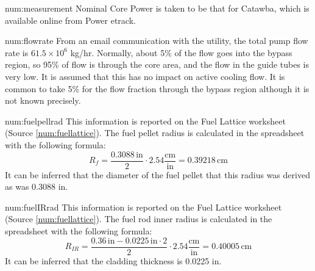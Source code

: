 \begin{numitem}{num:measurement}
  Nominal Core Power is taken to be that for Catawba, which is available online
  from Power etrack.
\end{numitem}

\begin{numitem}{num:flowrate}
  From an email communication with the utility, the total pump flow rate is $61.5\times 10^6$ kg/hr. Normally, about 5\% of the flow goes into the bypass region, so 95\% of flow is through the core area, and the flow in the guide tubes is very low. It is assumed that this has no impact on active cooling flow. It is common to take 5\% for the flow fraction through the bypass region although it is not known precisely. 
\end{numitem}

\begin{numitem}{num:fuelpellrad}
  This information is reported on the Fuel Lattice worksheet (Source \ref{num:fuellattice}). The fuel pellet radius is calculated in the spreadsheet with the following formula:
\[
    R_{f} = \frac{0.3088\,\mathrm{in}}{2}\cdot 2.54 \mathrm{\frac{cm}{in}} = 0.39218\,\mathrm{cm}
\]
  It can be inferred that the diameter of the fuel pellet that this radius was derived as was 0.3088 in.  
\end{numitem}

\begin{numitem}{num:fuelIRrad}
  This information is reported on the Fuel Lattice worksheet (Source \ref{num:fuellattice}). The fuel rod inner radius is calculated in the spreadsheet with the following formula:
\[
    R_{IR} = \frac{0.36\,\mathrm{in} - 0.0225\,\mathrm{in}\cdot 2}{2}\cdot 2.54 \mathrm{\frac{cm}{in}} = 0.40005\,\mathrm{cm}
\]
  It can be inferred that the cladding thickness is 0.0225 in.
  
\end{numitem}

